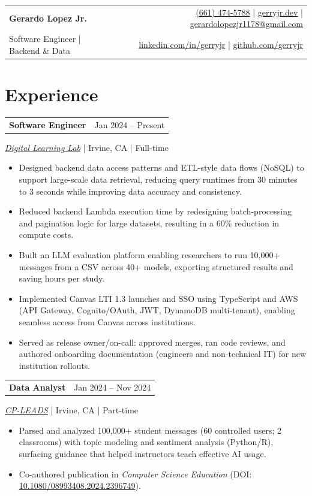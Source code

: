 \documentclass[11pt]{article}
\makeatletter
\newcommand{\twocol}[2]{%
  \noindent\begin{tabularx}{\textwidth}{@{}X r@{}}
    #1 & #2 \\
  \end{tabularx}\par
}
\newcommand{\roleblock}[5]{%
  \twocol{\textbf{#1}}{\textcolor{meta}{#2}}%
  {\textcolor{meta}{#3 \;|\; #4 \;|\; #5}}\par
}
\newenvironment{resumeItemize}{%
  \begin{itemize}[leftmargin=*, topsep=1pt, itemsep=0pt, parsep=0pt, partopsep=0pt]%
}{%
  \end{itemize}%
}
\makeatother
\begin{document}
\noindent\begin{tabularx}{\textwidth}{@{}X r@{}}
{\LARGE \textbf{Gerardo Lopez Jr.}} &
{\small
\href{tel:+16614745788}{(661) 474-5788} \;|\;
\href{https://gerryjr.dev}{gerryjr.dev} \;|\;
\href{mailto:gerardolopezjr1178@gmail.com}{gerardolopezjr1178@gmail.com}
} \\
[1pt]
{\large Software Engineer \textcolor{meta}{\;|\;} Backend \& Data} &
{\small
\href{https://linkedin.com/in/gerryjr}{linkedin.com/in/gerryjr} \;|\;
\href{https://github.com/gerryjr}{github.com/gerryjr}
} \\
\end{tabularx}

\vspace{2pt}
\small

\section{Experience}

\roleblock{Software Engineer}{Jan 2024 -- Present}{\href{https://www.digitallearninglab.org/}{\textit{Digital Learning Lab}}}{Irvine, CA}{Full-time}
\begin{resumeItemize}
  \item Designed backend data access patterns and ETL-style data flows (NoSQL) to support large-scale data retrieval, reducing query runtimes from 30 minutes to 3 seconds while improving data accuracy and consistency.
  \item Reduced backend Lambda execution time by redesigning batch-processing and pagination logic for large datasets, resulting in a 60\% reduction in compute costs.
  \item Built an LLM evaluation platform enabling researchers to run 10,000+ messages from a CSV across 40+ models, exporting structured results and saving hours per study.
  \item Implemented Canvas LTI 1.3 launches and SSO using TypeScript and AWS (API Gateway, Cognito/OAuth, JWT, DynamoDB multi-tenant), enabling seamless access from Canvas across institutions.
  \item Served as release owner/on-call: approved merges, ran code reviews, and authored onboarding \mbox{documentation} (engineers and non-technical IT) for new institution rollouts.
\end{resumeItemize}
\vspace{3pt}

\roleblock{Data Analyst}{Jan 2024 -- Nov 2024}{\href{https://sites.uci.edu/cpleads/}{\textit{CP-LEADS}}}{Irvine, CA}{Part-time}
\begin{resumeItemize}
  \item Parsed and analyzed 100,000+ student messages (60 controlled users; 2 classrooms) with topic modeling and sentiment analysis (Python/R), surfacing guidance that helped instructors teach effective AI usage.
  \item Co-authored publication in \textit{Computer Science Education} (DOI: \href{https://doi.org/10.1080/08993408.2024.2396749}{10.1080/08993408.2024.2396749}).
\end{resumeItemize}
\vspace{3pt}
\end{document}
